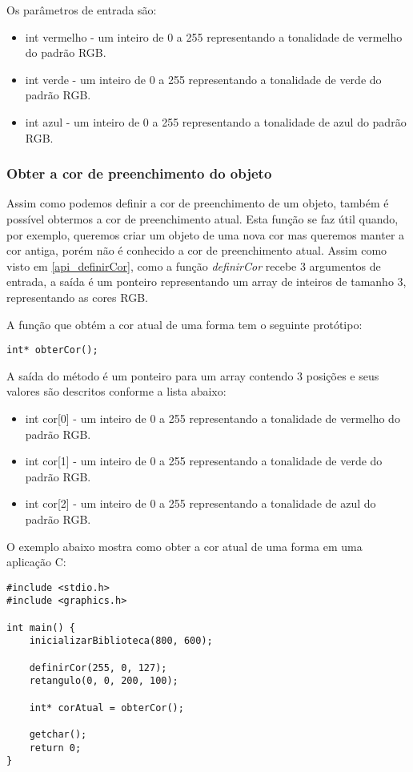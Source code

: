 \documentclass[12pt, %
openright,
oneside, %
a4paper,    %
brazil]{facom-ufu-abntex2}
\begin{document}
Os parâmetros de entrada são:

\begin{itemize}
    \item int vermelho - um inteiro de 0 a 255 representando a tonalidade de vermelho do padrão RGB.
    \item int verde - um inteiro de 0 a 255 representando a tonalidade de verde do padrão RGB.
    \item int azul - um inteiro de 0 a 255 representando a tonalidade de azul do padrão RGB.
\end{itemize}

\subsubsection{Obter a cor de preenchimento do objeto}
Assim como podemos definir a cor de preenchimento de um objeto, também é possível obtermos a cor de preenchimento atual. Esta função se faz útil quando, por exemplo, queremos criar um objeto de uma nova cor mas queremos manter a cor antiga, porém não é conhecido a cor de preenchimento atual. Assim como visto em \ref{api_definirCor}, como a função \textit{definirCor} recebe 3 argumentos de entrada, a saída é um ponteiro representando um array de inteiros de tamanho 3, representando as cores RGB.

A função que obtém a cor atual de uma forma tem o seguinte protótipo:

\begin{verbatim}
int* obterCor();
\end{verbatim}

A saída do método é um ponteiro para um array contendo 3 posições e seus valores são descritos conforme a lista abaixo:

\begin{itemize}
    \item int cor[0] - um inteiro de 0 a 255 representando a tonalidade de vermelho do padrão RGB.
    \item int cor[1] - um inteiro de 0 a 255 representando a tonalidade de verde do padrão RGB.
    \item int cor[2] - um inteiro de 0 a 255 representando a tonalidade de azul do padrão RGB.
\end{itemize}

O exemplo abaixo mostra como obter a cor atual de uma forma em uma aplicação C:

\begin{verbatim}
#include <stdio.h>
#include <graphics.h>

int main() {
    inicializarBiblioteca(800, 600);

    definirCor(255, 0, 127);
    retangulo(0, 0, 200, 100);

    int* corAtual = obterCor();

    getchar();
    return 0;
}
\end{verbatim}
\end{document}
